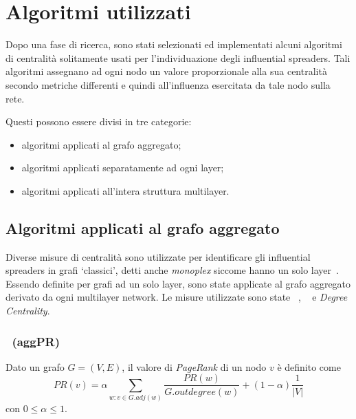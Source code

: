 \chapter{Algoritmi utilizzati}
Dopo una fase di ricerca, sono stati selezionati ed implementati alcuni algoritmi di centralità solitamente usati per 
l'individuazione degli influential spreaders. Tali algoritmi assegnano ad ogni nodo un valore proporzionale alla sua centralità 
secondo metriche differenti e quindi all'influenza esercitata da tale nodo sulla rete.

Questi possono essere divisi in tre categorie:
\begin{itemize}
\item algoritmi applicati al grafo aggregato;
\item algoritmi applicati separatamente ad ogni layer;
\item algoritmi applicati all'intera struttura multilayer.
\end{itemize}

\section{Algoritmi applicati al grafo aggregato}
Diverse misure di centralità sono utilizzate per identificare gli influential spreaders in grafi 
`classici', detti anche \textit{monoplex} siccome hanno un solo layer~\cite{basaras:infsp}\cite{kitsak:infsp}\cite{pei:infsp}. 
Essendo definite per grafi ad un solo layer, sono state applicate al grafo aggregato
derivato da ogni multilayer network. 
Le misure utilizzate sono state \emph{\PageRank}~\cite{page:pagerank}, 
\emph{\kcore}~\cite{batagelj:kcore} e 
\emph{Degree Centrality}.


\subsection{\PageRank~(aggPR)}
\label{alg:pagerank}
\begin{definizione}[\PageRank]
    \label{def:pagerank}
    Dato un grafo $G=(V, E)$, il valore di \emph{PageRank} di un nodo $v$ è definito come
    \begin{equation*}
        \mathit{PR}(v) = \alpha\sum_{w : v \in G.\mathit{adj}(w)}
        \frac{\mathit{PR}(w)}{G.\mathit{outdegree}(w)} + 
        (1-\alpha)\frac{1}{|V|}
    \end{equation*}
    con $0 \le \alpha \le 1$.
\end{definizione}

